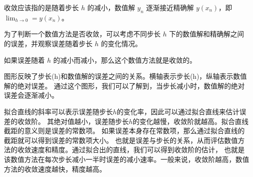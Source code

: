 \documentclass[12pt, a4paper, oneside]{ctexart}
\begin{document}
\begin{spacing}{2.0}
收敛应该指的是随着步长 $h$ 的减小，数值解 $y_n$ 逐渐接近精确解 $y(x_n)$，即 $\lim_{h \to 0} = y(x_n) $。

为了判断一个数值方法是否收敛，可以考虑不同步长 $h$ 下的数值解和精确解之间的误差，并观察误差随着步长 $h$ 的变化情况。

如果误差随着 $h$ 的减小而减小，那么这个数值方法就是收敛的。

图形反映了步长(h)和数值解的误差之间的关系。横轴表示步长(h)，纵轴表示数值解的绝对误差。
通过这个图形，我们可以了解到，当步长减小时，数值解的绝对误差会逐渐减小。

拟合直线的斜率可以表示误差随步长$h$的变化率，因此可以通过拟合直线来估计误差的收敛阶。
其绝对值越小，误差随步长$h$的变化越慢，收敛阶就越高。拟合直线截距的意义则是误差的常数项。
如果误差本身存在常数项，那么通过拟合直线的截距就可以得到误差的常数项大小。
也就是误差与步长的关系，从而评估数值方法的收敛速度和精度。通过拟合出的直线，我们可以得到收敛阶的估计，
也就是该数值方法在每次步长减小一半时误差的减小速率。一般来说，收敛阶越高，数值方法的收敛速度越快，精度越高。




\end{spacing}{}
\end{document}
